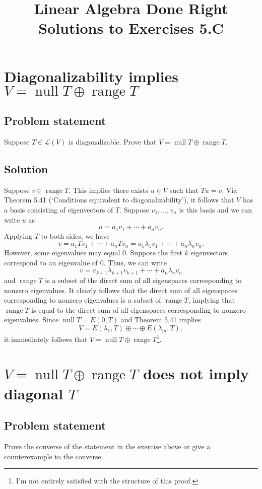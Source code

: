 \documentclass{article}
\title{Linear Algebra Done Right\\Solutions to Exercises 5.C}
\author{}
\date{}
\begin{document}
\maketitle

\section{Diagonalizability implies $V=\operatorname{null}T\oplus\operatorname{range}T$}
\subsection*{Problem statement}
Suppose $T\in\mathcal{L}(V)$ is diagonalizable. 
Prove that $V=\operatorname{null}T\oplus\operatorname{range}T$.

\subsection*{Solution}
Suppose $v\in\operatorname{range}T$. 
This implies there exists $u\in V$ such that $Tu=v$. 
Via Theorem 5.41 (`Conditions equivalent to diagonalizability'), it follows that $V$ has a basis consisting of eigenvectors of $T$. 
Suppose $v_1,\ldots,v_n$ is this basis and we can write $u$ as
\[u=a_1v_1 +\cdots +a_nv_n.\]
Applying $T$ to both sides, we have
\[v=a_1Tv_1 +\cdots +a_nTv_n=a_1\lambda_1v_1 +\cdots + a_n\lambda_n v_n.\]
However, some eigenvalues may equal $0$.
Suppose the first $k$ eigenvectors correspond to an eigenvalue of $0$. 
Thus, we can write
\[v=a_{k+1}\lambda_{k+1}v_{k+1}+\cdots+a_n\lambda_n v_n\]
and $\operatorname{range}T$ is a subset of the direct sum of all eigenspaces corresponding to nonzero eigenvalues. 
It clearly follows that the direct sum of all eigenspaces corresponding to nonzero eigenvalues is a subset of $\operatorname{range}T$, implying that $\operatorname{range}T$ is equal to the direct sum of all eigenspaces corresponding to nonzero eigenvalues.
Since $\operatorname{null}T=E(0,T)$ and Theorem 5.41 implies 
\[V=E(\lambda_1,T)\oplus\cdots\oplus E(\lambda_m,T),\]
it immediately follows that $V=\operatorname{null}T\oplus\operatorname{range}T$\footnote{I'm not entirely satisfied with the structure of this proof.}.

\clearpage

\section{$V=\operatorname{null}T\oplus\operatorname{range}T$ does not imply diagonal $T$}
\subsection*{Problem statement}
Prove the converse of the statement in the exercise above or give a counterexample to the converse.
\end{document}
